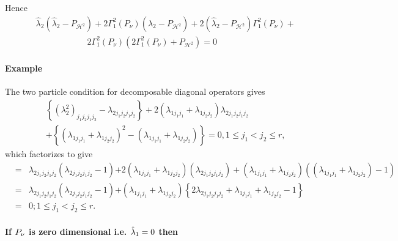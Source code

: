 \documentclass[12pt]{article}
\begin{document}
Hence 
\begin{eqnarray*}
&&\hat{\lambda}_{2}\left( \hat{\lambda}_{2}-P_{\mathcal{H}^{2}}\right)
+2\Gamma _{1}^{2}\left( P_{\mathcal{\nu }}\right) \left( \hat{\lambda}%
_{2}-P_{\mathcal{H}^{2}}\right) +2\left( \hat{\lambda}_{2}-P_{\mathcal{H}%
^{2}}\right) \Gamma _{1}^{2}\left( P_{\mathcal{\nu }}\right) + \\
&&\qquad \qquad \qquad 2\Gamma _{1}^{2}\left( P_{\mathcal{\nu }}\right)
\left( 2\Gamma _{1}^{2}\left( P_{\mathcal{\nu }}\right) +P_{\mathcal{H}%
^{2}}\right) =0
\end{eqnarray*}

\paragraph{Example}

The two particle condition for decomposable diagonal operators gives 
\begin{eqnarray*}
&&\left\{ \left( \lambda _{2}^{2}\right) _{j_{1}j_{2}j_{1}j_{2}}-\lambda
_{2j_{1}j_{2}j_{1}j_{2}}\right\} +2\left( \lambda _{1j_{1}j_{1}}+\lambda
_{1j_{2}j_{2}}\right) \lambda _{2j_{1}j_{2}j_{1}j_{2}} \\
&&\left. +\right. \left\{ \left( \lambda _{1j_{1}j_{1}}+\lambda
_{1j_{2}j_{2}}\right) ^{2}-\left( \lambda _{1j_{1}j_{1}}+\lambda
_{1j_{2}j_{2}}\right) \right\} =0,1\leq j_{1}<j_{2}\leq r,
\end{eqnarray*}%
which factorizes to give%
\begin{eqnarray*}
&=&\lambda _{2j_{1}j_{2}j_{1}j_{2}}\left( \lambda
_{2j_{1}j_{2}j_{1}j_{2}}-1\right) \left. +\right. 2\left( \lambda
_{1j_{1}j_{1}}+\lambda _{1j_{2}j_{2}}\right) \left( \lambda
_{2j_{1}j_{2}j_{1}j_{2}}\right) +\left( \lambda _{1j_{1}j_{1}}+\lambda
_{1j_{2}j_{2}}\right) \left( \left( \lambda _{1j_{1}j_{1}}+\lambda
_{1j_{2}j_{2}}\right) -1\right) \\
&=&\lambda _{2j_{1}j_{2}j_{1}j_{2}}\left( \lambda
_{2j_{1}j_{2}j_{1}j_{2}}-1\right) \left. +\right. \left( \lambda
_{1j_{1}j_{1}}+\lambda _{1j_{2}j_{2}}\right) \left\{ 2\lambda
_{2j_{1}j_{2}j_{1}j_{2}}+\lambda _{1j_{1}j_{1}}+\lambda
_{1j_{2}j_{2}}-1\right\} \\
&=&0;1\leq j_{1}<j_{2}\leq r.
\end{eqnarray*}

\paragraph{If $P_{\mathcal{\protect\nu }}$ is zero dimensional i.e. $\hat{%
\protect\lambda}_{1}=0$ then}
\end{document}
